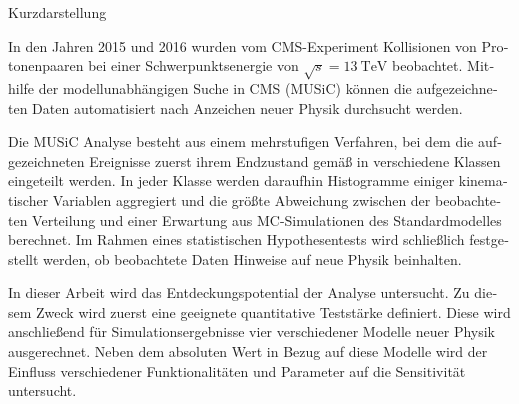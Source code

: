 
\vspace{1cm}
{Kurzdarstellung}
\chapterheadendvskip

\begin{otherlanguage}{german}
In den Jahren 2015 und 2016 wurden vom \acs{CMS}-Experiment Kollisionen von Protonenpaaren bei einer Schwerpunktsenergie von $\sqrt{s} = \SI{13}{\TeV}$ beobachtet. Mithilfe der modellunabhängigen Suche in \acs{CMS} (\ac{MUSiC}) können die aufgezeichneten Daten automatisiert nach Anzeichen neuer Physik durchsucht werden.

Die \ac{MUSiC} Analyse besteht aus einem mehrstufigen Verfahren, bei dem die aufgezeichneten Ereignisse zuerst ihrem Endzustand gemäß in verschiedene Klassen eingeteilt werden. In jeder Klasse werden daraufhin Histogramme einiger kinematischer Variablen aggregiert und die größte Abweichung zwischen der beobachteten Verteilung und einer Erwartung aus \acl{MC}-Simulationen des Standardmodelles berechnet. Im Rahmen eines statistischen Hypothesentests wird schließlich festgestellt werden, ob beobachtete Daten Hinweise auf neue Physik beinhalten.

In dieser Arbeit wird das Entdeckungspotential der Analyse untersucht. Zu diesem Zweck wird zuerst eine geeignete quantitative Teststärke definiert. Diese wird anschließend für Simulationsergebnisse vier verschiedener Modelle neuer Physik ausgerechnet. Neben dem absoluten Wert in Bezug auf diese Modelle wird der Einfluss verschiedener Funktionalitäten und Parameter auf die Sensitivität untersucht.
\end{otherlanguage}